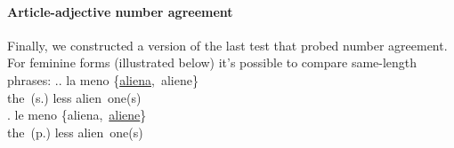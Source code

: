 

\paragraph{Article-adjective number agreement}
Finally, we constructed a version of the last test that probed number agreement. For feminine forms (illustrated below) it's possible to compare same-length phrases:
\ex.\ag. la meno \{\underline{aliena},\ aliene\} \\
the\ (s.) less alien\ one(s) \\
\bg. le meno \{aliena,\ \underline{aliene}\} \\
the\ (p.) less alien\ one(s) \\

